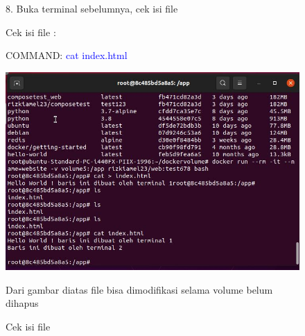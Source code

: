 \begin{figure}
    8. Buka terminal sebelumnya, cek isi file

    Cek isi file :

    COMMAND: \textcolor{Blue}{cat index.html}
        \begin{center}
            \includegraphics[width=\linewidth]{image/70.jpg}
            \caption{Cek isi file}
            \label{fig:my_figure}
        \end{center}
    
    Dari gambar diatas file bisa dimodifikasi selama volume belum dihapus 
\end{figure}

